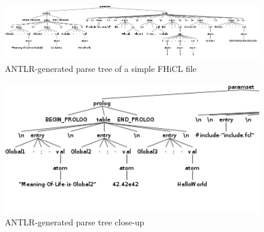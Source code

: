 \documentclass{article}
\begin{document}
		\begin{figure}[htbp]
      \begin{center}
        \includegraphics[width=13cm]{antlr4.png}
        \caption{ANTLR-generated parse tree of a simple FHiCL file}
        \label{fig:fullTree}
      \end{center}
    \end{figure}
		\begin{figure}[htbp]
      \begin{center}
        \includegraphics[width=13cm]{antlr4_section.png}
        \caption{ANTLR-generated parse tree close-up}
        \label{fig:justProlog}
      \end{center}
    \end{figure}
\end{document}

